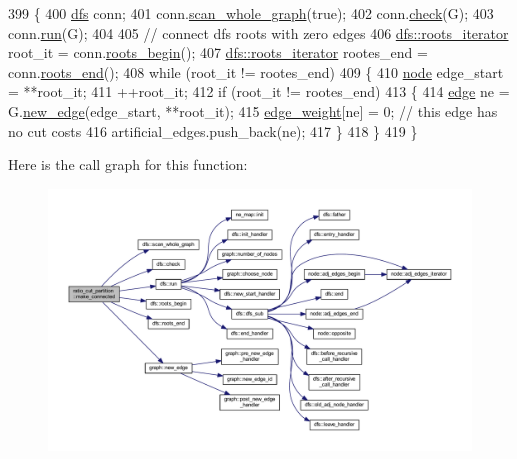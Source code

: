 \begin{DoxyCode}
399 \{
400     \mbox{\hyperlink{classdfs}{dfs}} conn;
401     conn.\mbox{\hyperlink{classdfs_aa7c864a6f3a120720138b187b3ed95b5}{scan\_whole\_graph}}(\textcolor{keyword}{true});
402     conn.\mbox{\hyperlink{classdfs_a1af70060897529e67910f589b047e576}{check}}(G);
403     conn.\mbox{\hyperlink{classdfs_af0863b8974d5fd58cd0375c78ed8163b}{run}}(G);
404 
405     \textcolor{comment}{// connect dfs roots with zero edges}
406     \mbox{\hyperlink{classdfs_a1ea6e8eb2766ac95ac48a8523359065a}{dfs::roots\_iterator}} root\_it = conn.\mbox{\hyperlink{classdfs_af56fa2b736f0b924dba1257e18ba4b61}{roots\_begin}}();
407     \mbox{\hyperlink{classdfs_a1ea6e8eb2766ac95ac48a8523359065a}{dfs::roots\_iterator}} rootes\_end = conn.\mbox{\hyperlink{classdfs_ae1a61d8c2d8d99059cab410f766ec73f}{roots\_end}}();
408     \textcolor{keywordflow}{while} (root\_it != rootes\_end)
409     \{
410     \mbox{\hyperlink{classnode}{node}} edge\_start = **root\_it;
411     ++root\_it;
412     \textcolor{keywordflow}{if} (root\_it != rootes\_end)
413     \{
414         \mbox{\hyperlink{classedge}{edge}} ne = G.\mbox{\hyperlink{classgraph_a02a0c3a219f75d68caa408ef339d4a1c}{new\_edge}}(edge\_start, **root\_it);
415         \mbox{\hyperlink{classratio__cut__partition_a48a85c82fb09b83c9d494d6d1232fab2}{edge\_weight}}[ne] = 0; \textcolor{comment}{// this edge has no cut costs}
416         artificial\_edges.push\_back(ne);
417     \}
418     \}
419 \}
\end{DoxyCode}
Here is the call graph for this function\+:\nopagebreak
\begin{figure}[H]
\begin{center}
\leavevmode
\includegraphics[width=350pt]{classratio__cut__partition_a46dba3eabbf31ce9d3545ba67fba1b62_cgraph}
\end{center}
\end{figure}
